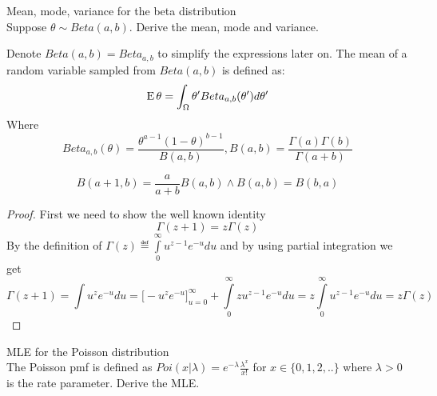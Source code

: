 \documentclass[a4paper,twoside=false,abstract=false,numbers=noenddot,
titlepage=false,headings=small,parskip=half,version=last]{scrartcl}
\begin{document}

\begin{exercise}{2.16} Mean, mode, variance for the beta distribution \\
    Suppose $\theta \sim Beta(a,b)$. Derive the mean, mode and variance.
\end{exercise}
\begin{solution}
    Denote $Beta(a,b)=Beta_{a,b}$ to simplify the expressions later on. The
    mean of a random variable sampled from $Beta(a,b)$ is defined as:
    \begin{equation}
        {\rm E}\,\theta = \int_\Omega\theta'Beta_{a,b}(\theta')d\theta'
    \end{equation}
    Where 
    \begin{equation}
        Beta_{a,b}(\theta)=\frac{\theta^{a-1}(1-\theta)^{b-1}}{B(a,b)},
        B(a,b)=\frac{\Gamma(a)\Gamma(b)}{\Gamma(a+b)}
    \end{equation}
    \begin{lemma}
        \label{lem:Bplus1}
        \begin{equation}
            B(a+1,b)=\frac{a}{a+b}B(a,b)\wedge B(a,b)=B(b,a)
        \end{equation}
    \end{lemma}
    \begin{proof}
        First we need to show the well known identity
        \begin{equation}
            \Gamma(z+1)=z\Gamma(z)
        \end{equation}
        By the definition of $\Gamma(z) \eqdef
        \int\limits_0^\infty{u^{z-1}e^{-u}du}$
        and by using partial integration we get
        \begin{equation}
            \Gamma(z+1)=\int{u^ze^{-u}du}=\big[-u^ze^{-u}\big]_{u=0}^\infty+
            \int\limits_0^\infty{zu^{z-1}e^{-u}du}=z\int\limits_0^\infty{u^{z-1}e^{-u}du}=z\Gamma(z)
        \end{equation}
    \end{proof}
\end{solution}

\begin{exercise}{3.6} MLE for the Poisson distribution \\
    The Poisson pmf is defined as
    $Poi(x|\lambda)=e^{-\lambda}\frac{\lambda^x}{x!}$ for $x \in \{0,1,2,..\}$
    where $\lambda>0$ is the rate parameter. Derive the MLE. 
\end{exercise}
\begin{solution}

\end{solution}
\end{document}
